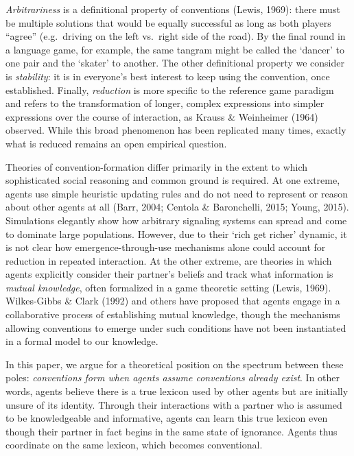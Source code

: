 \documentclass[alpha-refs]{wiley-article}
\begin{document}
\emph{Arbitrariness} is a definitional property of conventions (Lewis,
1969): there must be multiple solutions that would be equally successful
as long as both players ``agree'' (e.g.~driving on the left vs.~right
side of the road). By the final round in a language game, for example,
the same tangram might be called the `dancer' to one pair and the
`skater' to another. The other definitional property we consider is
\emph{stability}: it is in everyone's best interest to keep using the
convention, once established. Finally, \emph{reduction} is more specific
to the reference game paradigm and refers to the transformation of
longer, complex expressions into simpler expressions over the course of
interaction, as Krauss \& Weinheimer (1964) observed. While this broad
phenomenon has been replicated many times, exactly what is reduced
remains an open empirical question.

Theories of convention-formation differ primarily in the extent to which
sophisticated social reasoning and common ground is required. At one
extreme, agents use simple heuristic updating rules and do not need to
represent or reason about other agents at all (Barr, 2004; Centola \&
Baronchelli, 2015; Young, 2015). Simulations elegantly show how
arbitrary signaling systems can spread and come to dominate large
populations. However, due to their `rich get richer' dynamic, it is not
clear how emergence-through-use mechanisms alone could account for
reduction in repeated interaction. At the other extreme, are theories in
which agents explicitly consider their partner's beliefs and track what
information is \emph{mutual knowledge}, often formalized in a game
theoretic setting (Lewis, 1969). Wilkes-Gibbs \& Clark (1992) and others
have proposed that agents engage in a collaborative process of
establishing mutual knowledge, though the mechanisms allowing
conventions to emerge under such conditions have not been instantiated
in a formal model to our knowledge.

In this paper, we argue for a theoretical position on the spectrum
between these poles: \emph{conventions form when agents assume
conventions already exist}. In other words, agents believe there is a
true lexicon used by other agents but are initially unsure of its
identity. Through their interactions with a partner who is assumed to be
knowledgeable and informative, agents can learn this true lexicon even
though their partner in fact begins in the same state of ignorance.
Agents thus coordinate on the same lexicon, which becomes conventional.
\end{document}
